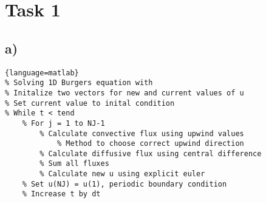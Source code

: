 \documentclass{article}
\begin{document}
\section{Task 1}


\subsection{a)}

\begin{lstlisting}{language=matlab}
% Solving 1D Burgers equation with
% Initalize two vectors for new and current values of u
% Set current value to inital condition
% While t < tend
	% For j = 1 to NJ-1
		% Calculate convective flux using upwind values
			% Method to choose correct upwind direction
		% Calculate diffusive flux using central difference
		% Sum all fluxes
		% Calculate new u using explicit euler
	% Set u(NJ) = u(1), periodic boundary condition
	% Increase t by dt
\end{lstlisting}
\end{document}
